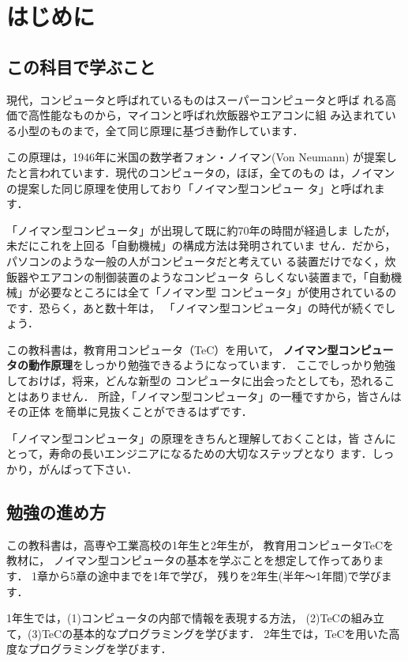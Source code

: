 \chapter{はじめに}

\section{この科目で学ぶこと}
現代，コンピュータと呼ばれているものはスーパーコンピュータと呼ば
れる高価で高性能なものから，マイコンと呼ばれ炊飯器やエアコンに組
み込まれている小型のものまで，全て同じ原理に基づき動作しています．

この原理は，1946年に米国の数学者フォン・ノイマン(Von Neumann)
が提案したと言われています．現代のコンピュータの，ほぼ，全てのもの
は，ノイマンの提案した同じ原理を使用しており「ノイマン型コンピュー
タ」と呼ばれます．

「ノイマン型コンピュータ」が出現して既に約70年の時間が経過しま
したが，未だにこれを上回る「自動機械」の構成方法は発明されていま
せん．だから，パソコンのような一般の人がコンピュータだと考えてい
る装置だけでなく，炊飯器やエアコンの制御装置のようなコンピュータ
らしくない装置まで，「自動機械」が必要なところには全て「ノイマン型
コンピュータ」が使用されているのです．恐らく，あと数十年は，
「ノイマン型コンピュータ」の時代が続くでしょう．

この教科書は，教育用コンピュータ（TeC）を用いて，
{\bf ノイマン型コンピュータの動作原理}をしっかり勉強できるようになっています．
ここでしっかり勉強しておけば，将来，どんな新型の
コンピュータに出会ったとしても，恐れることはありません．
所詮，「ノイマン型コンピュータ」の一種ですから，皆さんはその正体
を簡単に見抜くことができるはずです．

「ノイマン型コンピュータ」の原理をきちんと理解しておくことは，皆
さんにとって，寿命の長いエンジニアになるための大切なステップとなり
ます．しっかり，がんばって下さい．

\section{勉強の進め方}

この教科書は，高専や工業高校の1年生と2年生が，
教育用コンピュータTeCを教材に，
ノイマン型コンピュータの基本を学ぶことを想定して作ってあります．
1章から5章の途中までを1年で学び，
残りを2年生(半年〜1年間)で学びます．

1年生では，(1)コンピュータの内部で情報を表現する方法，
(2)TeCの組み立て，(3)TeCの基本的なプログラミングを学びます．
2年生では，TeCを用いた高度なプログラミングを学びます．

